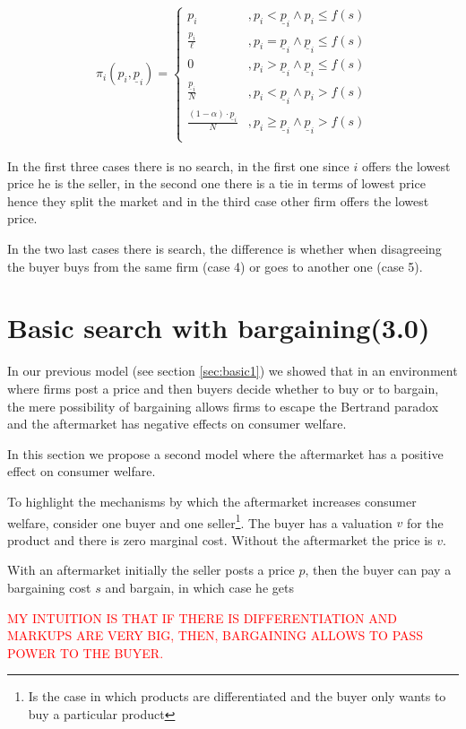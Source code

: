 \documentclass[12pt]{article}
\theoremstyle{plain}
\theoremstyle{plain}
\begin{document}
\begin{align}
    \pi_i(p_i, \underline{p}_i ) = 
    \begin{cases}
        p_i &, p_i < \underline{p}_i \land p_i \leq f(s) \\
        \frac{p_i}{\ell} &, p_i = \underline{p}_i \land \underline{p}_i \leq f(s) \\
        0 &, p_i > \underline{p}_i \land \underline{p}_i  \leq f(s)\\
        \frac{\underline{p}_i }{N} &, p_i < \underline{p}_i \land p_i > f(s) \\
        \frac{(1-\alpha) \cdot \underline{p}_i }{N} &, p_i \geq \underline{p}_i \land \underline{p}_i > f(s)\\      
    \end{cases}
\end{align}

In the first three cases there is no search, in the first one since $i$ offers the lowest price he is the seller, in the second one there is a tie in terms of lowest price hence they split the market and in the third case other firm offers the lowest price. 

In the two last cases there is search, the difference is whether when disagreeing the buyer buys from the same firm (case 4) or goes to another one (case 5). 


\section{Basic search with bargaining(3.0)}

In our previous model (see section \ref{sec:basic1}) we showed that in an environment where firms post a price and then buyers decide whether to buy or to bargain, the mere possibility of bargaining allows firms to escape the Bertrand paradox and the aftermarket has negative effects on consumer welfare. 

In this section we propose a second model where the aftermarket has a positive effect on consumer welfare. 

To highlight the mechanisms by which the aftermarket increases consumer welfare, consider one buyer and one seller\footnote{Is the case in which products are differentiated and the buyer only wants to buy a particular product}. The buyer has a valuation $v$ for the product and there is zero marginal cost. Without the aftermarket the price is $v$. 

With an aftermarket initially the seller posts a price $p$, then the buyer can pay a bargaining cost $s$ and bargain, in which case he gets 

\textcolor{red}{MY INTUITION IS THAT IF THERE IS DIFFERENTIATION AND MARKUPS ARE VERY BIG, THEN, BARGAINING ALLOWS TO PASS POWER TO THE BUYER. }
\end{document}
